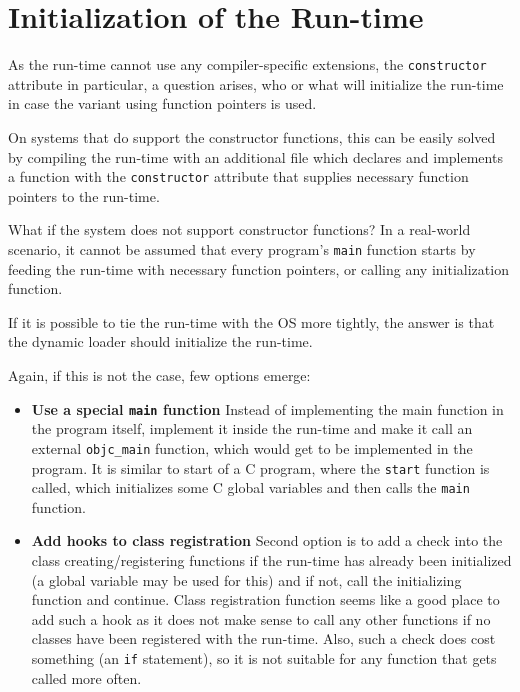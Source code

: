 \section{Initialization of the Run-time}

As the run-time cannot use any compiler-specific extensions, the \verb=constructor= attribute in particular, a question arises, who or what will initialize the run-time in case the variant using function pointers is used.

On systems that do support the constructor functions, this can be easily solved by compiling the run-time with an additional file which declares and implements a function with the \verb=constructor= attribute that supplies necessary function pointers to the run-time.

What if the system does not support constructor functions? In a real-world scenario, it cannot be assumed that every program's \verb=main= function starts by feeding the run-time with necessary function pointers, or calling any initialization function.

If it is possible to tie the run-time with the OS more tightly, the answer is that the dynamic loader should initialize the run-time.

Again, if this is not the case, few options emerge:

\begin{itemize}
  \item{\bf{Use a special \verb=main= function}} Instead of implementing the main function in the program itself, implement it inside the run-time and make it call an external \verb=objc_main= function, which would get to be implemented in the program. It is similar to start of a C program, where the \verb=start= function is called, which initializes some C global variables and then calls the \verb=main= function.
  \item{\bf{Add hooks to class registration}} Second option is to add a check into the class creating/registering functions if the run-time has already been initialized (a global variable may be used for this) and if not, call the initializing function and continue. Class registration function seems like a good place to add such a hook as it does not make sense to call any other functions if no classes have been registered with the run-time. Also, such a check does cost something (an \verb=if= statement), so it is not suitable for any function that gets called more often.
\end{itemize}


